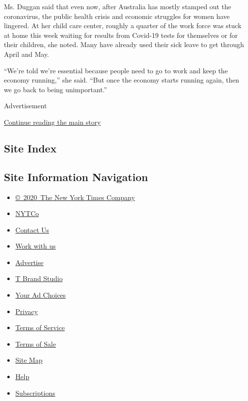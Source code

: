 Ms. Duggan said that even now, after Australia has mostly stamped out
the coronavirus, the public health crisis and economic struggles for
women have lingered. At her child care center, roughly a quarter of the
work force was stuck at home this week waiting for results from Covid-19
tests for themselves or for their children, she noted. Many have already
used their sick leave to get through April and May.

``We're told we're essential because people need to go to work and keep
the economy running,'' she said. ``But once the economy starts running
again, then we go back to being unimportant.''

Advertisement

\protect\hyperlink{after-bottom}{Continue reading the main story}

\hypertarget{site-index}{%
\subsection{Site Index}\label{site-index}}

\hypertarget{site-information-navigation}{%
\subsection{Site Information
Navigation}\label{site-information-navigation}}

\begin{itemize}
\tightlist
\item
  \href{https://help.nytimes3xbfgragh.onion/hc/en-us/articles/115014792127-Copyright-notice}{©~2020~The
  New York Times Company}
\end{itemize}

\begin{itemize}
\tightlist
\item
  \href{https://www.nytco.com/}{NYTCo}
\item
  \href{https://help.nytimes3xbfgragh.onion/hc/en-us/articles/115015385887-Contact-Us}{Contact
  Us}
\item
  \href{https://www.nytco.com/careers/}{Work with us}
\item
  \href{https://nytmediakit.com/}{Advertise}
\item
  \href{http://www.tbrandstudio.com/}{T Brand Studio}
\item
  \href{https://www.nytimes3xbfgragh.onion/privacy/cookie-policy\#how-do-i-manage-trackers}{Your
  Ad Choices}
\item
  \href{https://www.nytimes3xbfgragh.onion/privacy}{Privacy}
\item
  \href{https://help.nytimes3xbfgragh.onion/hc/en-us/articles/115014893428-Terms-of-service}{Terms
  of Service}
\item
  \href{https://help.nytimes3xbfgragh.onion/hc/en-us/articles/115014893968-Terms-of-sale}{Terms
  of Sale}
\item
  \href{https://spiderbites.nytimes3xbfgragh.onion}{Site Map}
\item
  \href{https://help.nytimes3xbfgragh.onion/hc/en-us}{Help}
\item
  \href{https://www.nytimes3xbfgragh.onion/subscription?campaignId=37WXW}{Subscriptions}
\end{itemize}
